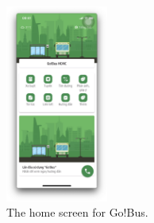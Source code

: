 \begin{figure}[H]
    \centering
    \includegraphics[width=0.3\textwidth]{assets/images/Research/Bus/gobus_home.png}
    \caption{The home screen for Go!Bus.}
    \label{fig:gobus_homescreen}
\end{figure}

